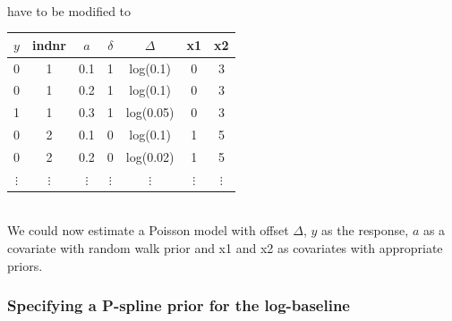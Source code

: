 \documentclass[11pt,a4paper,twoside]{bayesxarticle}
\begin{document}
\vspace{0.5cm}\\
have to be modified to
\vspace{0.5cm}\\
\begin{tabular}{c|c|c|c|c|c|c}
$y$ & indnr & $a$& $\delta$ &  $\Delta$ &   x1 & x2\\\hline\hline
0 &  1 &   0.1 &   1  &  log(0.1) & 0  & 3\\
0  & 1   & 0.2  &  1  &  log(0.1) & 0 &  3\\
1  & 1   & 0.3  &  1  &  log(0.05)& 0  & 3\\\hline
0 &  2 &   0.1 &   0 &   log(0.1) & 1 &  5\\
0  & 2  &  0.2 &   0  &  log(0.02)& 1 &  5\\\hline
$\vdots$ & $\vdots$ & $\vdots$ & $\vdots$ & $\vdots$ & $\vdots$& $\vdots$\\
\end{tabular}
\vspace{0.5cm}\\
We could now estimate a Poisson model with offset $\Delta$, $y$ as
the response, $a$ as a covariate with random walk prior and x1 and
x2 as covariates with appropriate priors.


\subsubsection{Specifying a P-spline prior for the log-baseline}
\end{document}
